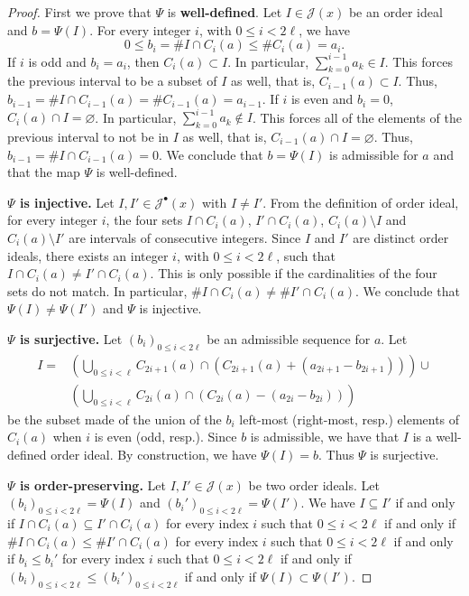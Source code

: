 \documentclass[a4paper,12pt]{amsart}
\newcommand{\xx}{{x}}
\newcommand{\Jcal}{{\mathcal{J}}}
\newcommand{\0}{\mathtt{0}}
\newcommand{\1}{\mathtt{1}}
\newcommand{\2}{\mathtt{2}}
\newcommand{\3}{\mathtt{3}}
\begin{document}
\begin{proof}
    First we prove that $\Psi$ is \textbf{well-defined}.
    Let $I\in\Jcal(\xx)$ be an order ideal and $b=\Psi(I)$.
    For every integer $i$, with $0\leq i< 2\ell$, we have
    \[
        0
        \leq
    b_i=\# I\cap C_i(a)
    \leq \# C_i(a)
      = a_i.
    \]
    If $i$ is odd and $b_i = a_i$, then $C_i(a)\subset I$.
    In particular, $\sum_{k=0}^{i-1}a_k\in I$.
    This forces the previous interval to be a subset of $I$ as well, that is,
    $C_{i-1}(a)\subset I$.
    Thus, $b_{i-1} =\# I\cap C_{i-1}(a) =\# C_{i-1}(a) =a_{i-1}$.
    If $i$ is even and $b_i = 0$, $C_i(a)\cap I=\varnothing$.
    In particular, $\sum_{k=0}^{i-1}a_k\notin I$.
    This forces all of the elements of the previous interval to
    not be in $I$ as well, that is,
    $C_{i-1}(a)\cap I=\varnothing$. Thus, $b_{i-1}=\# I\cap C_{i-1}(a) = 0$.
    We conclude that $b=\Psi(I)$ is admissible for $a$
    and that the map $\Psi$ is well-defined.

    \textbf{$\Psi$ is injective.}
    Let $I,I'\in \Jcal^\bullet(\xx)$ with $I\neq I'$.
    From the definition of order ideal,
    for every integer $i$,
    the four sets
    $I\cap C_i(a)$,
    $I'\cap C_i(a)$,
    $C_i(a)\setminus I$ and
    $C_i(a)\setminus I'$ are intervals of consecutive integers.
    Since $I$ and $I'$ are distinct order ideals,
    there exists
    an integer $i$, with $0\leq i< 2\ell$, such that
    $I\cap C_i(a) \neq I'\cap C_i(a)$.
    This is only possible if the cardinalities of the four sets do not match.
    In particular, $\# I\cap C_i(a) \neq \# I'\cap C_i(a)$.
    We conclude that $\Psi(I)\neq\Psi(I')$ and $\Psi$ is injective.

    \textbf{$\Psi$ is surjective.}
    Let $(b_i)_{0\leq i< 2\ell}$ be
    an admissible sequence for $a$.
    Let
    \begin{align*}
        I = &\left(\bigcup_{0\leq i< \ell} C_{2i+1}(a)\cap (C_{2i+1}(a)+(a_{2i+1}-b_{2i+1}))\right)
            \cup\\
          &\left(\bigcup_{0\leq i< \ell} C_{2i}(a)\cap (C_{2i}(a)-(a_{2i}-b_{2i}))\right)
    \end{align*}
    be the subset made of the union of the
    $b_i$ left-most (right-most, resp.) elements of $C_i(a)$ when $i$ is even (odd, resp.).
    Since $b$ is admissible, we have that $I$ is a well-defined order ideal.
    By construction, we have $\Psi(I)=b$. Thus $\Psi$ is surjective.

    \textbf{$\Psi$ is order-preserving.}
    Let $I, I'\in \Jcal(\xx)$ be two order ideals.
    Let $(b_i)_{0\leq i< 2\ell}=\Psi(I)$
    and $(b_i')_{0\leq i< 2\ell}=\Psi(I')$.
    We have
    $I\subseteq I'$
    if and only if
    $I\cap C_i(a)\subseteq I'\cap C_i(a)$ for every index $i$ such that $0\leq i< 2\ell$
    if and only if
    $\# I\cap C_i(a)\leq \# I'\cap C_i(a)$ for every index $i$ such that $0\leq i< 2\ell$
    if and only if
    $b_i\leq b_i'$ for every index $i$ such that $0\leq i< 2\ell$
    if and only if
    $(b_i)_{0\leq i< 2\ell}\leq (b_i')_{0\leq i< 2\ell}$
    if and only if
    $\Psi(I)\subset\Psi(I')$.


\end{proof}
\end{document}
